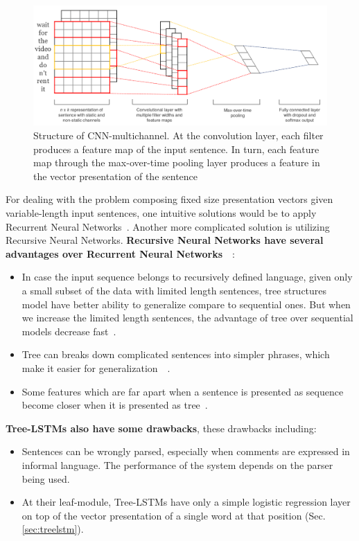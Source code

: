 \begin{figure}[H]
    \centering
    \includegraphics[scale=0.33]{figure/sentencecnn}
    \caption[CNN-multichannel]{Structure of CNN-multichannel. 
    At the convolution layer, each filter produces a feature map of the input sentence. 
    In turn, each feature map through the max-over-time pooling layer produces a feature in the vector presentation of the sentence}
    \label{fig:CNN-multichannel}
\end{figure}

For dealing with the problem composing fixed size presentation vectors given variable-length input sentences, one intuitive solutions would be to apply Recurrent Neural Networks~\cite{cnn-rnn}.
Another more complicated solution is utilizing Recursive Neural Networks.
\textbf{Recursive Neural Networks have several advantages over Recurrent Neural Networks}~\cite{need-tree}~\cite{bowman-treevslstm}: 
\begin{itemize}
\item In case the input sequence belongs to recursively defined language, given only a small subset of the data with limited length sentences, tree structures model have better ability to generalize compare to sequential ones.
But when we increase the limited length sentences, the advantage of tree over sequential models decrease fast~\cite{bowman-treevslstm}. 
\item Tree can breaks down complicated sentences into simpler phrases, which make it easier for generalization~\cite{knowledge-matter}~\cite{need-tree}.
\item Some features which are far apart when a sentence is presented as sequence become closer when it is presented as tree~\cite{need-tree}.
\end{itemize}

\textbf{Tree-LSTMs also have some drawbacks}, these drawbacks including:
\begin{itemize}
\item Sentences can be wrongly parsed, especially when comments are expressed in informal language.
The performance of the system depends on the parser being used.
\item At their leaf-module, Tree-LSTMs have only a simple logistic regression layer on top of the vector presentation of a single word at that position (Sec.\ref{sec:treelstm}). 
\end{itemize}


